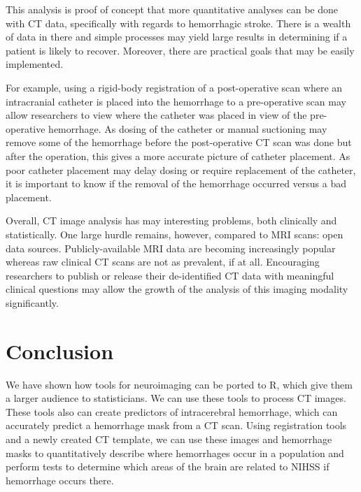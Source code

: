 This analysis is proof of concept that more quantitative analyses can be done with CT data, specifically with regards to hemorrhagic stroke.  There is a wealth of data in there and simple processes may yield large results in determining if a patient is likely to recover.  Moreover, there are practical goals that may be easily implemented.  

For example, using a rigid-body registration of a post-operative scan where an intracranial catheter is placed into the hemorrhage to a pre-operative scan may allow researchers to view where the catheter was placed in view of the pre-operative hemorrhage.  As dosing of the catheter or manual suctioning may remove some of the hemorrhage before the post-operative CT scan was done but after the operation, this gives a more accurate picture of catheter placement. As poor catheter placement may delay dosing or require replacement of the catheter, it is important to know if the removal of the hemorrhage occurred versus a bad placement.  

Overall, CT image analysis has may interesting problems, both clinically and statistically.  One large hurdle remains, however, compared to MRI scans: open data sources.  Publicly-available MRI data are becoming increasingly popular whereas raw clinical CT scans are not as prevalent, if at all.  Encouraging researchers to publish or release their de-identified CT data with meaningful clinical questions may allow the growth of the analysis of this imaging modality significantly.  


\section{Conclusion}
We have shown how tools for neuroimaging can be ported to R, which give them a larger audience to statisticians.  We can use these tools to process CT images.  These tools also can create predictors of intracerebral hemorrhage, which can accurately predict a hemorrhage mask from a CT scan.  Using registration tools and a newly created CT template, we can use these images and hemorrhage masks to quantitatively describe where hemorrhages occur in a population and perform tests to determine which areas of the brain are related to NIHSS if hemorrhage occurs there. 

